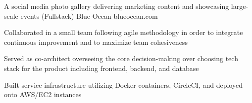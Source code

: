 \begin{cventries}
\cventry
{A social media photo gallery delivering marketing content and showcasing large-scale events (Fullstack)} %
{Blue Ocean} %
{blueocean.com} %
{} %
{
  \begin{cvitems} %
    \item {Collaborated in a small team following agile methodology in order to integrate continuous improvement and to maximize team cohesiveness}
    \item {Served as co-architect overseeing the core decision-making over choosing tech stack for the product including frontend, backend, and database}
    \item {Built service infrastructure utilizing Docker containers, CircleCI, and deployed onto AWS/EC2 instances}
  \end{cvitems}
}

\end{cventries}
